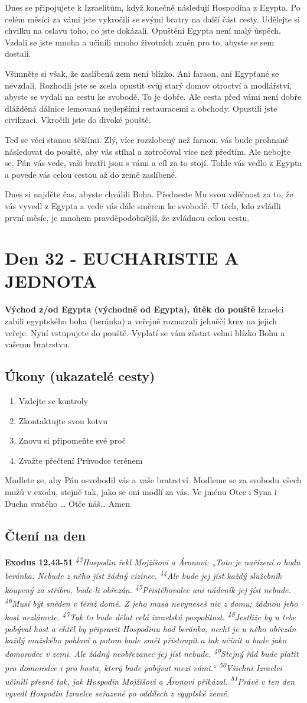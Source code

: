 \documentclass[11pt]{article}
\newcommand{\zacatekPatyTyden}{
  \textbf{Východ z/od Egypta (východně od Egypta), útěk do pouště} \newline
  Izraelci zabili egyptského boha (beránka) a veřejně rozmazali jehněčí krev na jejich veřeje. Nyní vstupujete
  do pouště. Vyplatí se vám zůstat velmi blízko Bohu a vašemu bratrstvu.

\subsection*{Úkony (ukazatelé cesty)}
\begin{enumerate}
  \item Vzdejte se kontroly
  \item Zkontaktujte svou kotvu
  \item Znovu si připomeňte své proč
  \item Zvažte přečtení Průvodce terénem
\end{enumerate}
Modlete se, aby Pán osvobodil vás a vaše bratrství. \newline
Modleme se za svobodu všech mužů v exodu, stejně tak, jako se oni modlí za vás.\newline
Ve jménu Otce i Syna i Ducha svatého …  Otče náš… Amen
}
\begin{document}
Dnes se připojujete k Izraelitům, když konečně následují Hospodina z Egypta. Po celém měsíci za vámi jste vykročili
se svými bratry na další část cesty. Udělejte si chvilku na oslavu toho, co jste dokázali. Opuštění Egypta není malý
úspěch. Vzdali se jste mnoha a učinili mnoho životních změn pro to, abyste se sem dostali.

Všimněte si však, že zaslíbená zem není blízko. Ani faraon, ani Egypťané se nevzdali. Rozhodli jste se zcela opustit
svůj starý domov otroctví a modlářství, abyste se vydali na cestu ke svobodě. To je dobře. Ale cesta před vámi není
dobře dlážděná dálnice lemovaná nejlepšími restauracemi a obchody. Opustili jste civilizaci. Vkročili jste do divoké
pouště.

Teď se věci stanou těžšími. Zlý, více rozzlobený než faraon, vás bude prohnaně následovat do pouště, aby vás stíhal a
zotročoval více než předtím. Ale nebojte se, Pán vás vede, vaši bratři jsou s vámi a cíl za to stojí. Tohle vás vedlo
z Egypta a povede vás celou cestou až do země zaslíbené.

Dnes si najděte čas, abyste chválili Boha. Předneste Mu svou vděčnost za to, že vás vyvedl z Egypta a vede vás dále
směrem ke svobodě. U těch, kdo zvládli první měsíc, je mnohem pravděpodobnější, že zvládnou celou cestu.

\newpage
\section{Den 32 - EUCHARISTIE A JEDNOTA}
\zacatekPatyTyden
\subsection*{Čtení na den}
\textbf{Exodus 12,43-51}
\newline
\textit{
\textsuperscript{43}Hospodin řekl Mojžíšovi a Áronovi: „Toto je nařízení o hodu beránka: Nebude z něho jíst žádný cizinec.
\textsuperscript{44}Ale bude jej jíst každý služebník koupený za stříbro, bude-li obřezán.
\textsuperscript{45}Přistěhovalec ani nádeník jej jíst nebude.
\textsuperscript{46}Musí být sněden v témž domě. Z jeho masa nevyneseš nic z domu; žádnou jeho kost nezlámete.
\textsuperscript{47}Tak to bude dělat celá izraelská pospolitost.
\textsuperscript{48}Jestliže by u tebe pobýval host a chtěl by připravit Hospodinu hod beránka, nechť je u něho obřezán každý mužského pohlaví a potom bude smět přistoupit a tak učinit a bude jako domorodec v zemi. Ale žádný neobřezanec jej jíst nebude.
\textsuperscript{49}Stejný řád bude platit pro domorodce i pro hosta, který bude pobývat mezi vámi.“
\textsuperscript{50}Všichni Izraelci učinili přesně tak, jak Hospodin Mojžíšovi a Áronovi přikázal.
\textsuperscript{51}Právě v ten den vyvedl Hospodin Izraelce seřazené po oddílech z egyptské země.
}
\end{document}
